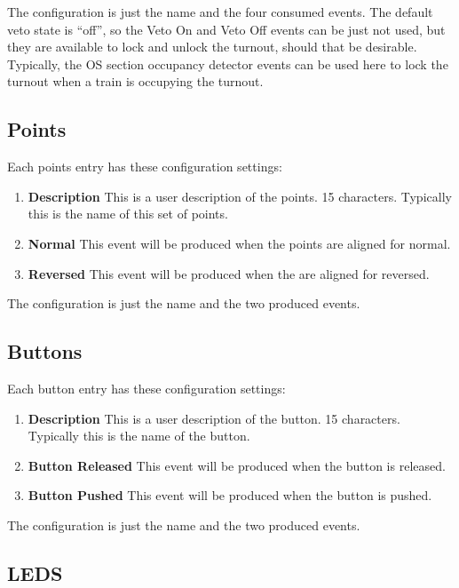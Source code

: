 The configuration is just the name and the four consumed events. The default
veto state is ``off'', so the Veto On and Veto Off events can be just not
used, but they are available to lock and unlock the turnout, should that be
desirable.  Typically, the OS section occupancy detector events can be used 
here to lock the turnout when a train is occupying the turnout.

\subsection{Points}

Each points entry has these configuration settings:

\begin{enumerate}
\item \textbf{Description} This is a user description of the points. 15 
characters.  Typically this is the name of this set of points.
\item \textbf{Normal} This event will be produced when the points are aligned 
for normal.
\item \textbf{Reversed} This event will be produced when the are aligned for 
reversed.
\end{enumerate}

The configuration is just the name and the two produced events.

\subsection{Buttons}

Each button entry has these configuration settings:

\begin{enumerate}
\item \textbf{Description} This is a user description of the button. 15 
characters.  Typically this is the name of the button.
\item \textbf{Button Released} This event will be produced when the button is 
released.
\item \textbf{Button Pushed} This event will be produced when the button is 
pushed.
\end{enumerate}

The configuration is just the name and the two produced events.

\subsection{LEDS}

